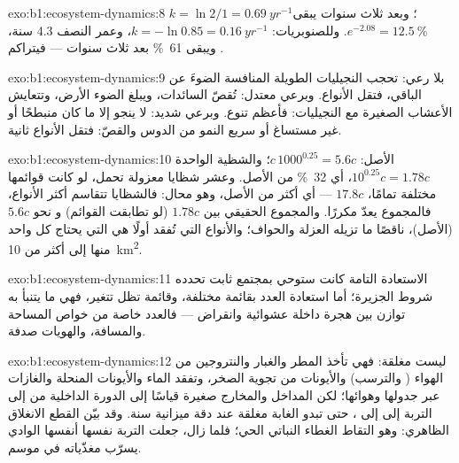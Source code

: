 \begin{solution}{exo:b1:ecosystem-dynamics:8}
$k = \ln 2/1 = \qty{0.69}{yr^{-1}}$؛ وبعد ثلاث سنوات يبقى $e^{-2.08} =
\qty{12.5}{\%}$. وللصنوبريات: $k = -\ln 0.85 = \qty{0.16}{yr^{-1}}$،
وعمر النصف \num{4.3} سنة، ويبقى \qty{61}{\%} بعد ثلاث سنوات --- فيتراكم
.
\end{solution}

\begin{solution}{exo:b1:ecosystem-dynamics:9}
بلا رعي: تحجب النجيليات الطويلة المنافسة الضوءَ عن الباقي، فتقل الأنواع.
وبرعي معتدل: تُقصّ السائدات، ويبلغ الضوء
الأرض، وتتعايش الأعشاب الصغيرة مع النجيليات: فأعظم تنوع. وبرعي
شديد: لا ينجو إلا ما كان منبطحًا أو غير مستساغ أو سريع النمو
من الدوس والقصّ: فتقل الأنواع ثانية.
\end{solution}

\begin{solution}{exo:b1:ecosystem-dynamics:10}
الأصل: $c\,1000^{0.25} = 5.6c$؛ والشظية الواحدة $10^{0.25}c = 1.78c$، أي
\qty{32}{\%} من الأصل. وعشر شظايا معزولة تحمل، لو كانت
قوائمها مختلفة تمامًا، $17.8c$ --- أي أكثر من الأصل،
وهو محال: فالشظايا تتقاسم أكثر الأنواع، فالمجموع
يعدّ مكررًا. والمجموع الحقيقي بين $1.78c$ (لو تطابقت القوائم) و
نحو $5.6c$ (الأصل)، ناقصًا ما تزيله العزلة والحواف؛
والأنواع التي تُفقد أولًا هي التي يحتاج كل واحد منها إلى أكثر من
\qty{10}{km^2}.
\end{solution}

\begin{solution}{exo:b1:ecosystem-dynamics:11}
الاستعادة التامة كانت ستوحي بمجتمع ثابت تحدده
شروط الجزيرة؛ أما استعادة العدد بقائمة مختلفة،
وقائمة تظل تتغير، فهي ما يتنبأ به توازن بين هجرة
داخلة عشوائية وانقراض --- فالعدد خاصة من خواص
المساحة والمسافة، والهويات صدفة.
\end{solution}

\begin{solution}{exo:b1:ecosystem-dynamics:12}
ليست مغلقة: فهي تأخذ المطر والغبار والنتروجين من الهواء (
والترسب) والأيونات من تجوية الصخر، وتفقد الماء
والأيونات المنحلة والغازات عبر جدولها وهوائها؛ لكن
المداخل والمخارج صغيرة قياسًا إلى الدورة الداخلية من
 إلى التربة إلى  إلى ، حتى تبدو الغابة مغلقة عند
دقة ميزانية سنة. وقد بيّن القطع 
الانغلاق الظاهري: وهو التقاط الغطاء النباتي الحي؛ فلما
زال، جعلت التربة نفسها  أنفسها الوادي يسرّب
مغذّياته في موسم.
\end{solution}

